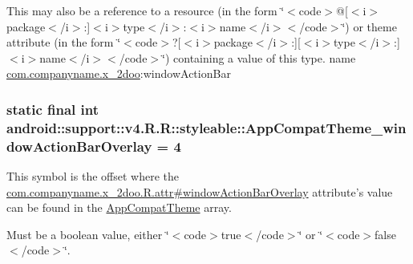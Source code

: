 This may also be a reference to a resource (in the form \char`\"{}$<$code$>$@\mbox{[}$<$i$>$package$<$/i$>$:\mbox{]}$<$i$>$type$<$/i$>$:$<$i$>$name$<$/i$>$$<$/code$>$\char`\"{}) or theme attribute (in the form \char`\"{}$<$code$>$?\mbox{[}$<$i$>$package$<$/i$>$:\mbox{]}\mbox{[}$<$i$>$type$<$/i$>$:\mbox{]}$<$i$>$name$<$/i$>$$<$/code$>$\char`\"{}) containing a value of this type.  name \hyperlink{namespacecom_1_1companyname_1_1x__2doo}{com.companyname.x\_\-2doo}:windowActionBar \hypertarget{classandroid_1_1support_1_1v4_1_1_r_1_1styleable_924250499a476f5492258c6e60c451f7}{
\subsubsection[{AppCompatTheme\_\-windowActionBarOverlay}]{\setlength{\rightskip}{0pt plus 5cm}static final int android::support::v4.R.R::styleable::AppCompatTheme\_\-windowActionBarOverlay = 4}}
\label{classandroid_1_1support_1_1v4_1_1_r_1_1styleable_924250499a476f5492258c6e60c451f7}


This symbol is the offset where the \hyperlink{classcom_1_1companyname_1_1x__2doo_1_1_r_1_1attr_863e485ff797ded1a8ec6b847ee30779}{com.companyname.x\_\-2doo.R.attr\#windowActionBarOverlay} attribute's value can be found in the \hyperlink{classandroid_1_1support_1_1v4_1_1_r_1_1styleable_0873e92ba21076bb5a4aeadeb7f5779f}{AppCompatTheme} array.

Must be a boolean value, either \char`\"{}$<$code$>$true$<$/code$>$\char`\"{} or \char`\"{}$<$code$>$false$<$/code$>$\char`\"{}. 

